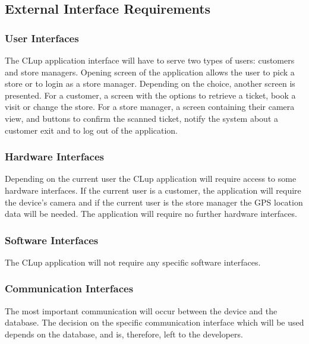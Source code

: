 \subsection{External Interface Requirements}
\subsubsection{User Interfaces}
\hspace{\parindent}The CLup application interface will have to serve two types of users: customers and store managers. Opening screen of the application allows the user to pick a store or to login as a store manager. Depending on the choice, another screen is presented. For a customer, a screen with the options to retrieve a ticket, book a visit or change the store. For a store manager, a screen containing their camera view, and buttons to confirm the scanned ticket, notify the system about a customer exit and to log out of the application. 
\subsubsection{Hardware Interfaces}
\hspace{\parindent}Depending on the current user the CLup application will require access to some hardware interfaces. If the current user is a customer, the application will require the device's camera and if the current user is the store manager the GPS location data will be needed. The application will require no further hardware interfaces.
\subsubsection{Software Interfaces}
\hspace{\parindent}The CLup application will not require any specific software interfaces.
\subsubsection{Communication Interfaces}
\hspace{\parindent}The most important communication will occur between the device and the database. The decision on the specific communication interface which will be used depends on the database, and is, therefore, left to the developers.

\newpage
